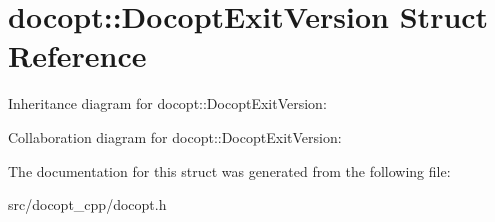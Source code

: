 \hypertarget{structdocopt_1_1DocoptExitVersion}{}\section{docopt\+:\+:Docopt\+Exit\+Version Struct Reference}
\label{structdocopt_1_1DocoptExitVersion}


Inheritance diagram for docopt\+:\+:Docopt\+Exit\+Version\+:


Collaboration diagram for docopt\+:\+:Docopt\+Exit\+Version\+:


The documentation for this struct was generated from the following file\+:\begin{DoxyCompactItemize}
\item 
src/docopt\+\_\+cpp/docopt.\+h\end{DoxyCompactItemize}
